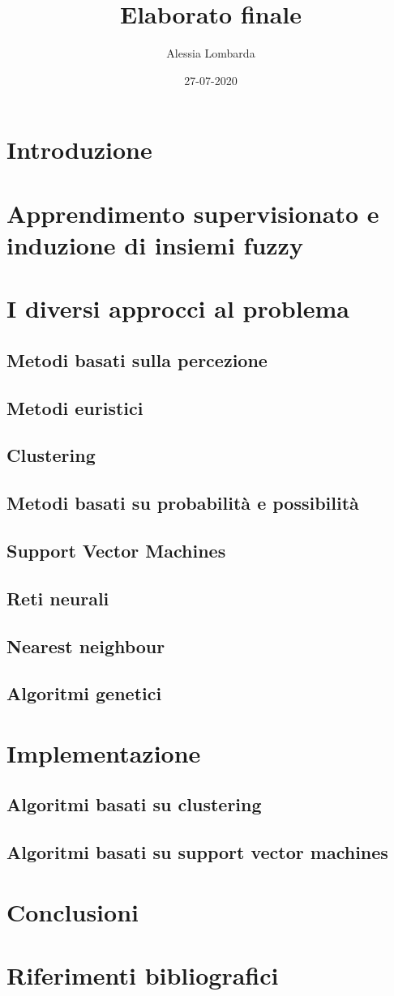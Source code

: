 \documentclass{article}
\title{Elaborato finale}
\date{27-07-2020}
\author{Alessia Lombarda}
\begin{document}
	\maketitle
	\tableofcontents
	\newpage
	\section{Introduzione}
	\section{Apprendimento supervisionato e induzione di insiemi fuzzy}
	\section{I diversi approcci al problema}
	\subsection{Metodi basati sulla percezione}
	\subsection{Metodi euristici}
	\subsection{Clustering}
	\subsection{Metodi basati su probabilit\`a e possibilit\`a}
	\subsection{Support Vector Machines}
	\subsection{Reti neurali}
	\subsection{Nearest neighbour}	
	\subsection{Algoritmi genetici}
	\section{Implementazione}
	\subsection{Algoritmi basati su clustering}
	\subsection{Algoritmi basati su support vector machines}
	\section{Conclusioni}
	\section{Riferimenti bibliografici}
	
\end{document}
